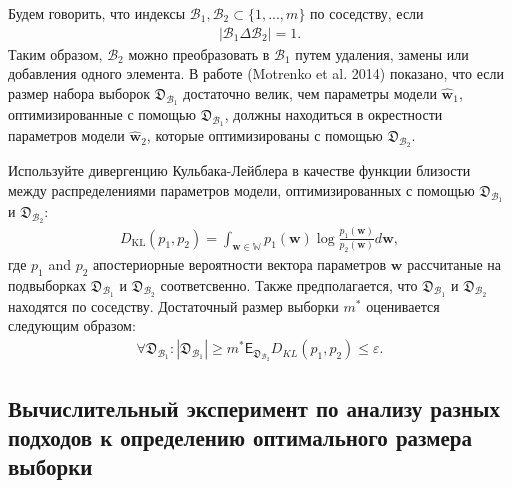 Будем говорить, что индексы $\mathcal{B}_1,\mathcal{B}_2 \subset \{1,...,m\}$ по соседству, если
\[
\label{eq:bs:8}
\begin{aligned}
	\left|\mathcal{B}_1 \Delta \mathcal{B}_2\right| = 1.
\end{aligned}
\]
Таким образом, $\mathcal{B}_2 $ можно преобразовать в $\mathcal{B}_1$ путем удаления, замены или добавления одного элемента. В работе (Motrenko et al. 2014) показано, что если размер набора выборок $\mathfrak {D}_{\mathcal {B}_1}$ достаточно велик, чем параметры модели $\hat{\textbf {w}}_1$, оптимизированные с помощью $\mathfrak{D}_{\mathcal{B}_1}$, должны находиться в окрестности параметров модели $\hat{\textbf{w}}_2 $, которые оптимизированы с помощью $\mathfrak{D}_{\mathcal {B}_2}$.
	 
Используйте дивергенцию Кульбака-Лейблера в качестве функции близости между распределениями параметров модели, оптимизированных с помощью $\mathfrak{D}_{\mathcal{B}_1}$ и $\mathfrak{D}_{\mathcal{B}_2}$:
\[
\label{eq:bs:9}
\begin{aligned}
	D_\text{KL}\left(p_1, p_2\right) = \int_{\textbf{w}\in\mathbb{W}}p_1(\textbf{w})\log\frac{p_1(\textbf{w})}{p_2(\textbf{w})}d\textbf{w},
\end{aligned}
\]
где $p_1$ and $p_2$ апостериорные вероятности вектора параметров $\textbf{w}$ рассчитаные на подвыборках $\mathfrak{D}_{\mathcal{B}_1}$ и $\mathfrak{D}_{\mathcal{B}_2}$ соответсвенно. Также предполагается, что $\mathfrak{D}_{\mathcal{B}_1}$ и $\mathfrak{D}_{\mathcal{B}_2}$ находятся по соседству.
Достаточный размер выборки $m^*$ оценивается следующим образом:
\[
\label{eq:bs:10}
\begin{aligned}
	\forall \mathfrak{D}_{\mathcal{B}_1}: \left|\mathfrak{D}_{\mathcal{B}_1}\right| \geq m^*    \mathsf{E}_{\mathfrak{D}_{\mathcal{B}_2}}D_{KL}\left(p_1, p_2\right) \leq \varepsilon.
\end{aligned}
\]

	  
\subsection{Вычислительный эксперимент по анализу разных подходов к определению оптимального размера выборки}
\begin{table}[!htp]
\centering
\caption{Описание выборок для эксперимента}
\label{table20}
\end{table} 

